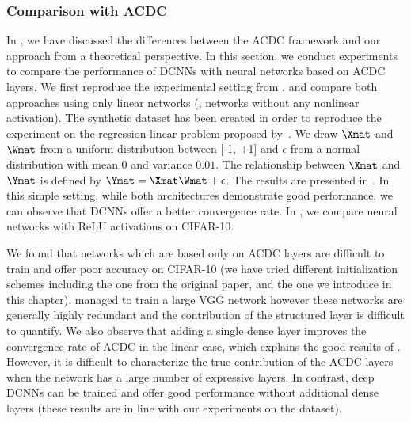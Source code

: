 \subsubsection{Comparison with ACDC}

In , we have discussed the differences between the ACDC framework and our approach from a theoretical perspective.
In this section, we conduct experiments to compare the performance of DCNNs with neural networks based on ACDC layers. 
We first reproduce the experimental setting from \citet{moczulski2016acdc}, and compare both approaches using only linear networks (\ie, networks without any nonlinear activation).
The synthetic dataset has been created in order to reproduce the experiment on the regression linear problem proposed by~\citet{moczulski2016acdc}.
We draw $\Xmat$ and $\Wmat$ from a uniform distribution between [-1, +1] and $\epsilon$ from a normal distribution with mean 0 and variance $0.01$.
The relationship between $\Xmat$ and $\Ymat$ is defined by $\Ymat = \Xmat\Wmat + \epsilon$. 
The results are presented in .
In this simple setting, while both architectures demonstrate good performance, we can observe that DCNNs offer a better convergence rate.
In , we compare neural networks with ReLU activations on CIFAR-10. 

We found that networks which are based only on ACDC layers are difficult to train and offer poor accuracy on CIFAR-10 (we have tried different initialization schemes including the one from the original paper, and the one we introduce in this chapter).
\citet{moczulski2016acdc} managed to train a large VGG network  however these networks are generally highly redundant and the contribution of the structured layer is difficult to quantify. 
We also observe that adding a single dense layer improves the convergence rate of ACDC in the linear case, which explains the good results of \citet{moczulski2016acdc}.
However, it is difficult to characterize the true contribution of the ACDC layers when the network has a large number of expressive layers.
In contrast, deep DCNNs can be trained and offer good performance without additional dense layers (these results are in line with our experiments on the \yt dataset).


